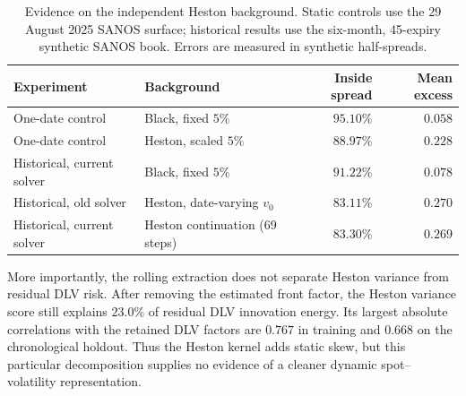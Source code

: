 \documentclass[11pt]{article}
\theoremstyle{plain}
\theoremstyle{definition}
\theoremstyle{remark}
\begin{document}
\begin{table}[htbp]
  \centering
  \small
  \caption{Evidence on the independent Heston background.  Static controls
  use the 29 August 2025 SANOS surface; historical results use the six-month,
  45-expiry synthetic SANOS book.  Errors are measured in synthetic
  half-spreads.}
  \label{tab:heston-background-fit}
  \begin{tabular}{@{}llrr@{}}
    \toprule
    Experiment & Background & Inside spread & Mean excess \\
    \midrule
    One-date control & Black, fixed $5\%$ & $95.10\%$ & $0.058$ \\
    One-date control & Heston, scaled $5\%$ & $88.97\%$ & $0.228$ \\
    Historical, current solver & Black, fixed $5\%$ & $91.22\%$ & $0.078$ \\
    Historical, old solver & Heston, date-varying $v_0$ & $83.11\%$ & $0.270$ \\
    Historical, current solver & Heston continuation (69 steps) & $83.30\%$ & $0.269$ \\
    \bottomrule
  \end{tabular}
\end{table}

More importantly, the rolling extraction does not separate Heston variance
from residual DLV risk.  After removing the estimated front factor, the Heston
variance score still explains $23.0\%$ of residual DLV innovation energy.  Its
largest absolute correlations with the retained DLV factors are $0.767$ in
training and $0.668$ on the chronological holdout.  Thus the Heston kernel
adds static skew, but this particular decomposition supplies no evidence of a
cleaner dynamic spot--volatility representation.
\end{document}

